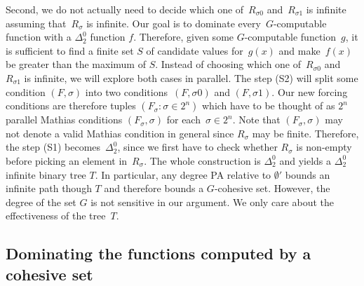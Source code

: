 

Second, we do not actually need to decide which one of~$R_{\sigma 0}$ and~$R_{\sigma 1}$ is infinite
assuming that~$R_{\sigma}$ is infinite. Our goal is to dominate every~$G$-computable function with a $\Delta^0_2$ function $f$.
Therefore, given some $G$-computable function~$g$, it is sufficient to find a finite set $S$ of candidate values for~$g(x)$ 
and make~$f(x)$ be greater than the maximum of $S$. Instead of choosing which one of~$R_{\sigma 0}$ and~$R_{\sigma 1}$ is infinite,
we will explore both cases in parallel. The step (S2) will split some condition $(F, \sigma)$
into two conditions~$(F, \sigma 0)$ and $(F, \sigma 1)$. Our new forcing conditions are therefore tuples $(F_\sigma : \sigma \in 2^n)$
which have to be thought of as $2^n$ parallel Mathias conditions $(F_\sigma, \sigma)$ for each~$\sigma \in 2^n$.
Note that $(F_\sigma, \sigma)$ may not denote a valid Mathias condition in general since $R_\sigma$ may be finite.
Therefore, the step (S1) becomes~$\Delta^0_2$, since we first have to check whether $R_\sigma$ is non-empty
before picking an element in~$R_\sigma$. The whole construction is $\Delta^0_2$ and yields a $\Delta^0_2$ infinite
binary tree $T$. In particular, any degree PA relative to $\emptyset'$ bounds an infinite path though $T$ and therefore bounds a $G$-cohesive set. However, the degree of the set $G$ is not sensitive in our argument. We only care about the effectiveness of
the tree~$T$.

\subsection{Dominating the functions computed by a cohesive set}


